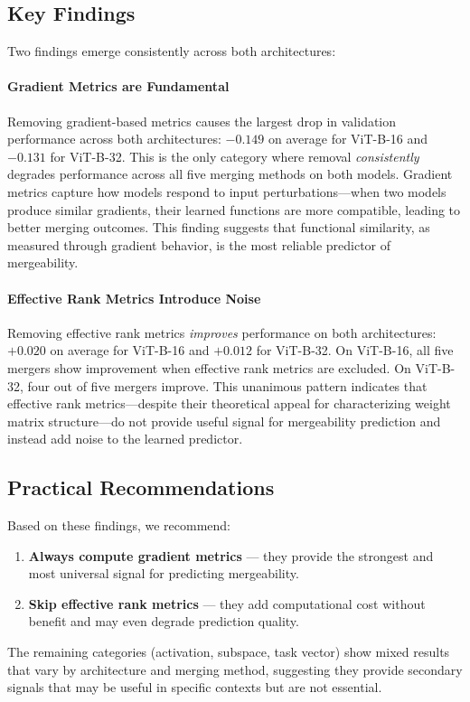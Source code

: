 \subsection{Key Findings}

Two findings emerge consistently across both architectures:

\paragraph{Gradient Metrics are Fundamental}
Removing gradient-based metrics causes the largest drop in validation performance across both architectures: $-0.149$ on average for ViT-B-16 and $-0.131$ for ViT-B-32. This is the only category where removal \emph{consistently} degrades performance across all five merging methods on both models. Gradient metrics capture how models respond to input perturbations---when two models produce similar gradients, their learned functions are more compatible, leading to better merging outcomes. This finding suggests that functional similarity, as measured through gradient behavior, is the most reliable predictor of mergeability.

\paragraph{Effective Rank Metrics Introduce Noise}
Removing effective rank metrics \emph{improves} performance on both architectures: $+0.020$ on average for ViT-B-16 and $+0.012$ for ViT-B-32. On ViT-B-16, all five mergers show improvement when effective rank metrics are excluded. On ViT-B-32, four out of five mergers improve. This unanimous pattern indicates that effective rank metrics---despite their theoretical appeal for characterizing weight matrix structure---do not provide useful signal for mergeability prediction and instead add noise to the learned predictor.

\subsection{Practical Recommendations}

Based on these findings, we recommend:
\begin{enumerate}
    \item \textbf{Always compute gradient metrics} --- they provide the strongest and most universal signal for predicting mergeability.
    \item \textbf{Skip effective rank metrics} --- they add computational cost without benefit and may even degrade prediction quality.
\end{enumerate}

The remaining categories (activation, subspace, task vector) show mixed results that vary by architecture and merging method, suggesting they provide secondary signals that may be useful in specific contexts but are not essential. 
